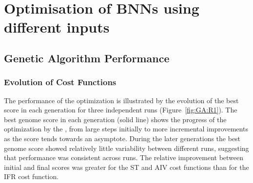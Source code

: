 \section{Optimisation of {BNN}s using different  inputs}\label{sec:GA:ResultDiffAN}






\subsection{Genetic Algorithm Performance}


\subsubsection{Evolution of Cost Functions}

The performance of the {\GA} optimization is illustrated by the evolution
of the best score in each generation for three independent {\GA} runs
(Figure~\ref{fig:GA:R1}). The best genome score in each generation (solid
line) shows the progress of the optimization by the {\GA}, from large steps
initially to more incremental improvements as the score tends towards an
asymptote.  During the later generations the best genome score showed
relatively little variability between different {\GA} runs, suggesting that
{\GA} performance was consistent across runs. The relative improvement
between initial and final scores was greater for the ST and AIV cost
functions than for the IFR cost function.


